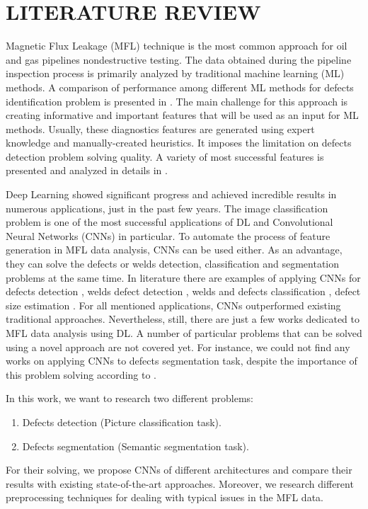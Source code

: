 \section{LITERATURE REVIEW}
\label{LITERATURE REVIEW}

Magnetic Flux Leakage (MFL) technique is the most common approach for oil and gas pipelines nondestructive testing.
The data obtained during the pipeline inspection process is primarily analyzed by traditional machine learning (ML) methods.
A comparison of performance among different ML methods for defects identification problem is presented in \cite{Khodayari-Rostamabad2009}.
The main challenge for this approach is creating informative and important features that will be used as an input for ML methods.
Usually, these diagnostics features are generated using expert knowledge and manually-created heuristics.
It imposes the limitation on defects detection problem solving quality.
A variety of most successful features is presented and analyzed in details in \cite{Slesarev2017}.

Deep Learning showed significant progress and achieved incredible results in numerous applications, just in the past few years.
The image classification problem is one of the most successful applications of DL and Convolutional Neural Networks (CNNs) in particular.
To automate the process of feature generation in MFL data analysis, CNNs can be used either.
As an advantage, they can solve the defects or welds detection, classification and segmentation problems at the same time.
In literature there are examples of applying CNNs for defects detection \cite{Feng2017}, welds defect detection \cite{2020a}, welds and defects classification \cite{Yang2020}, defect size estimation \cite{Lu2019}.
For all mentioned applications, CNNs outperformed existing traditional approaches.
Nevertheless, still, there are just a few works dedicated to MFL data analysis using DL.
A number of particular problems that can be solved using a novel approach are not covered yet.
For instance, we could not find any works on applying CNNs to defects segmentation task, despite the importance of this problem solving according to \cite{Feng2017}.

In this work, we want to research two different problems:
\begin{enumerate}
	\item Defects detection (Picture classification task).
	\item Defects segmentation (Semantic segmentation task).
\end{enumerate}

For their solving, we propose CNNs of different architectures and compare their results with existing state-of-the-art approaches.
Moreover, we research different preprocessing techniques for dealing with typical issues in the MFL data.

